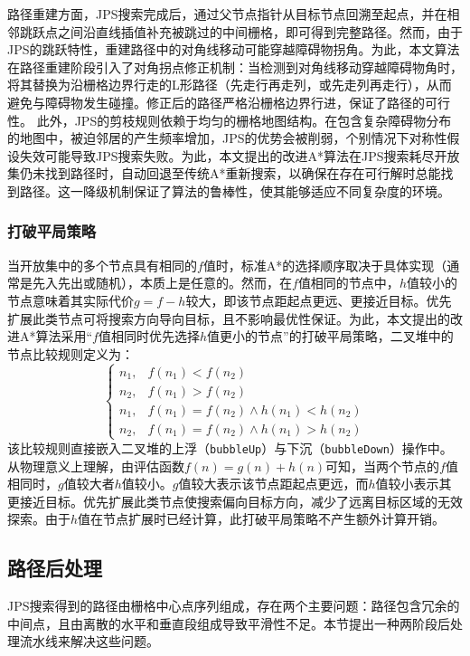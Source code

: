 \documentclass[lettersize,journal]{IEEEtran}
\begin{document}
路径重建方面，JPS搜索完成后，通过父节点指针从目标节点回溯至起点，并在相邻跳跃点之间沿直线插值补充被跳过的中间栅格，即可得到完整路径。然而，由于JPS的跳跃特性，重建路径中的对角线移动可能穿越障碍物拐角。为此，本文算法在路径重建阶段引入了对角拐点修正机制：当检测到对角线移动穿越障碍物角时，将其替换为沿栅格边界行走的L形路径（先走行再走列，或先走列再走行），从而避免与障碍物发生碰撞。修正后的路径严格沿栅格边界行进，保证了路径的可行性。
此外，JPS的剪枝规则依赖于均匀的栅格地图结构。在包含复杂障碍物分布的地图中，被迫邻居的产生频率增加，JPS的优势会被削弱，个别情况下对称性假设失效可能导致JPS搜索失败。为此，本文提出的改进A*算法在JPS搜索耗尽开放集仍未找到路径时，自动回退至传统A*重新搜索，以确保在存在可行解时总能找到路径。这一降级机制保证了算法的鲁棒性，使其能够适应不同复杂度的环境。
\subsubsection{打破平局策略}
当开放集中的多个节点具有相同的$f$值时，标准A*的选择顺序取决于具体实现（通常是先入先出或随机），本质上是任意的。然而，在$f$值相同的节点中，$h$值较小的节点意味着其实际代价$g = f - h$较大，即该节点距起点更远、更接近目标。优先扩展此类节点可将搜索方向导向目标，且不影响最优性保证。为此，本文提出的改进A*算法采用``$f$值相同时优先选择$h$值更小的节点''的打破平局策略，二叉堆中的节点比较规则定义为：
\begin{equation}
\begin{cases}
n_1, & f(n_1) < f(n_2) \\
n_2, & f(n_1) > f(n_2) \\
n_1, & f(n_1) = f(n_2) \land h(n_1) < h(n_2) \\
n_2, & f(n_1) = f(n_2) \land h(n_1) > h(n_2)
\end{cases}
\label{eq:tbreak}
\end{equation}
该比较规则直接嵌入二叉堆的上浮（\texttt{bubbleUp}）与下沉（\texttt{bubbleDown}）操作中。
从物理意义上理解，由评估函数$f(n) = g(n) + h(n)$可知，当两个节点的$f$值相同时，$g$值较大者$h$值较小。$g$值较大表示该节点距起点更远，而$h$值较小表示其更接近目标。优先扩展此类节点使搜索偏向目标方向，减少了远离目标区域的无效探索。由于$h$值在节点扩展时已经计算，此打破平局策略不产生额外计算开销。
\subsection{路径后处理}
\label{subsec:post}
JPS搜索得到的路径由栅格中心点序列组成，存在两个主要问题：路径包含冗余的中间点，且由离散的水平和垂直段组成导致平滑性不足。本节提出一种两阶段后处理流水线来解决这些问题。
\end{document}

